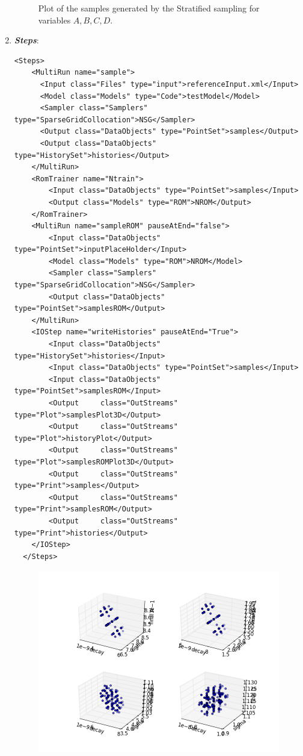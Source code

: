 \begin{enumerate}
\begin{figure}[h!]
  \caption{Plot of the samples generated by the Stratified sampling for variables $A,B,C,D$.}
  \label{fig:historiesSparseGridPlotLine}
 \end{figure}
   \item \textbf{\textit{Steps}}:   
\begin{lstlisting}[style=XML,morekeywords={arg,extension,pauseAtEnd,overwrite}]
  <Steps>
    <MultiRun name="sample">
      <Input class="Files" type="input">referenceInput.xml</Input>
      <Model class="Models" type="Code">testModel</Model>
      <Sampler class="Samplers" type="SparseGridCollocation">NSG</Sampler>
      <Output class="DataObjects" type="PointSet">samples</Output>
      <Output class="DataObjects" type="HistorySet">histories</Output>
    </MultiRun>
    <RomTrainer name="Ntrain">
        <Input class="DataObjects" type="PointSet">samples</Input>
        <Output class="Models" type="ROM">NROM</Output>
    </RomTrainer>
    <MultiRun name="sampleROM" pauseAtEnd="false">
        <Input class="DataObjects" type="PointSet">inputPlaceHolder</Input>
        <Model class="Models" type="ROM">NROM</Model>
        <Sampler class="Samplers" type="SparseGridCollocation">NSG</Sampler>
        <Output class="DataObjects" type="PointSet">samplesROM</Output>
    </MultiRun>
    <IOStep name="writeHistories" pauseAtEnd="True">
        <Input class="DataObjects" type="HistorySet">histories</Input>
        <Input class="DataObjects" type="PointSet">samples</Input>
        <Input class="DataObjects" type="PointSet">samplesROM</Input>
        <Output 	class="OutStreams" type="Plot">samplesPlot3D</Output>
        <Output 	class="OutStreams" type="Plot">historyPlot</Output>
        <Output 	class="OutStreams" type="Plot">samplesROMPlot3D</Output>
        <Output 	class="OutStreams" type="Print">samples</Output>
        <Output 	class="OutStreams" type="Print">samplesROM</Output>
        <Output 	class="OutStreams" type="Print">histories</Output>
    </IOStep>
  </Steps>
\end{lstlisting}
 \begin{figure}[h!]
  \centering
  \includegraphics[scale=0.7]{pics/samples_SparseGrid.png}

\end{figure}
\end{enumerate}

